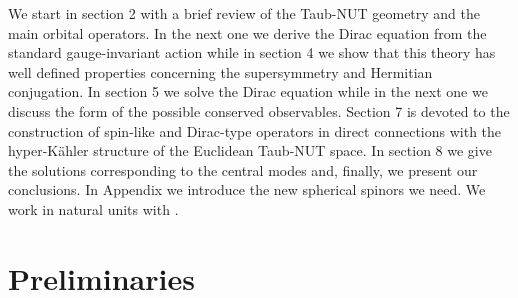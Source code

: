 \documentclass[a4paper,12pt]{article}
\begin{document}
We start in section 2 with a brief review of the Taub-NUT geometry and the 
main orbital operators. In the next one we derive the Dirac equation from 
the standard \coordHE{} gauge-invariant action  while in section 4 we show 
that this theory has well defined properties  concerning  the supersymmetry 
and Hermitian conjugation. In section 5 we  solve the Dirac equation while 
in the next one we discuss the form of the possible conserved observables. 
Section 7 is devoted to the construction of spin-like and Dirac-type 
operators in direct connections with the hyper-K\" ahler structure of the 
Euclidean Taub-NUT space. In  section 8  we give the solutions corresponding 
to the central modes and, finally, we present our conclusions. In Appendix 
we introduce the new spherical spinors we need.  We work in natural units 
with \coordHE{}.

\section{Preliminaries}
\
\end{document}
